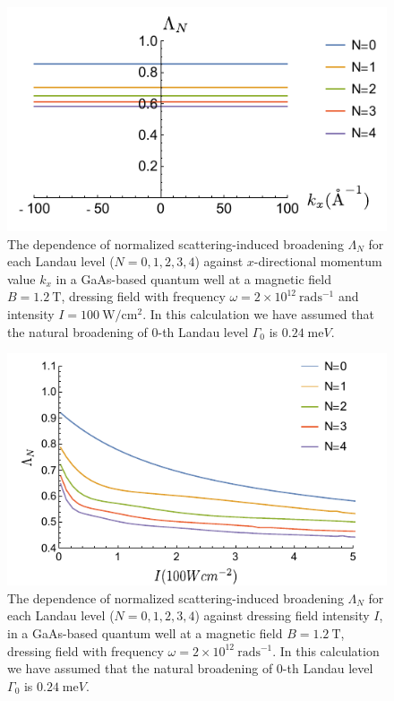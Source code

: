 \begin{figure}[t]
\includegraphics[scale=0.68]{figures/fig_3}
\caption{\label{fig_3} The dependence of normalized scattering-induced broadening $\Lambda_N$ for each Landau level ($N =0,1,2,3,4$) against $x$-directional momentum value $k_x$ in a GaAs-based quantum well at a magnetic field $B = 1.2~\text{T}$, dressing field with frequency $\omega =2\times10^{12}~\text{rad}\text{s}^{-1}$ and intensity $I =100~\text{W}/\text{cm}^{2}$.
In this calculation we have assumed that the natural  broadening of $0$-th Landau level $\Gamma_0$ is $0.24\;\text{me}V$.}
\end{figure}

\begin{figure}[t]
\includegraphics[scale=0.68]{figures/fig_4}
\caption{\label{fig_4} The dependence of normalized scattering-induced broadening $\Lambda_N$ for each Landau level ($N =0,1,2,3,4$) against dressing field intensity $I$, in a GaAs-based quantum well at a magnetic field $B = 1.2~\text{T}$, dressing field with frequency $\omega =2\times10^{12}~\text{rad}\text{s}^{-1}$. In this calculation we have assumed that the natural broadening of $0$-th Landau level $\Gamma_0$ is $0.24\;\text{me}V$.}
\end{figure}

